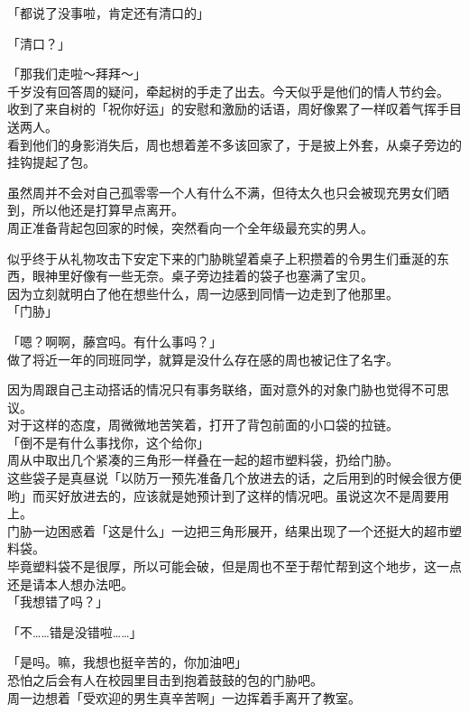 「都说了没事啦，肯定还有清口的」

「清口？」

「那我们走啦～拜拜～」\\

千岁没有回答周的疑问，牵起树的手走了出去。今天似乎是他们的情人节约会。\\

收到了来自树的「祝你好运」的安慰和激励的话语，周好像累了一样叹着气挥手目送两人。\\

看到他们的身影消失后，周也想着差不多该回家了，于是披上外套，从桌子旁边的挂钩提起了包。

虽然周并不会对自己孤零零一个人有什么不满，但待太久也只会被现充男女们晒到，所以他还是打算早点离开。\\

周正准备背起包回家的时候，突然看向一个全年级最充实的男人。

似乎终于从礼物攻击下安定下来的门胁眺望着桌子上积攒着的令男生们垂涎的东西，眼神里好像有一些无奈。桌子旁边挂着的袋子也塞满了宝贝。\\

因为立刻就明白了他在想些什么，周一边感到同情一边走到了他那里。\\

「门胁」

「嗯？啊啊，藤宫吗。有什么事吗？」\\

做了将近一年的同班同学，就算是没什么存在感的周也被记住了名字。

因为周跟自己主动搭话的情况只有事务联络，面对意外的对象门胁也觉得不可思议。\\

对于这样的态度，周微微地苦笑着，打开了背包前面的小口袋的拉链。\\

「倒不是有什么事找你，这个给你」\\

周从中取出几个紧凑的三角形一样叠在一起的超市塑料袋，扔给门胁。\\

这些袋子是真昼说「以防万一预先准备几个放进去的话，之后用到的时候会很方便哟」而买好放进去的，应该就是她预计到了这样的情况吧。虽说这次不是周要用上。\\

门胁一边困惑着「这是什么」一边把三角形展开，结果出现了一个还挺大的超市塑料袋。\\

毕竟塑料袋不是很厚，所以可能会破，但是周也不至于帮忙帮到这个地步，这一点还是请本人想办法吧。\\

「我想错了吗？」

「不……错是没错啦……」

「是吗。嘛，我想也挺辛苦的，你加油吧」\\

恐怕之后会有人在校园里目击到抱着鼓鼓的包的门胁吧。\\

周一边想着「受欢迎的男生真辛苦啊」一边挥着手离开了教室。


